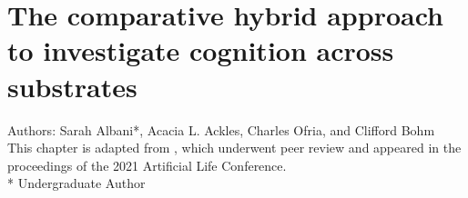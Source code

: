 \chapter{The comparative hybrid approach to investigate cognition across substrates}
\label{ch:chm}

\noindent Authors: Sarah Albani*, Acacia L. Ackles, Charles Ofria, and Clifford Bohm \\
This chapter is adapted from \cite{albani_comparative_2021}, which underwent peer review and appeared in the proceedings of the 2021 Artificial Life Conference.\\
* Undergraduate Author








